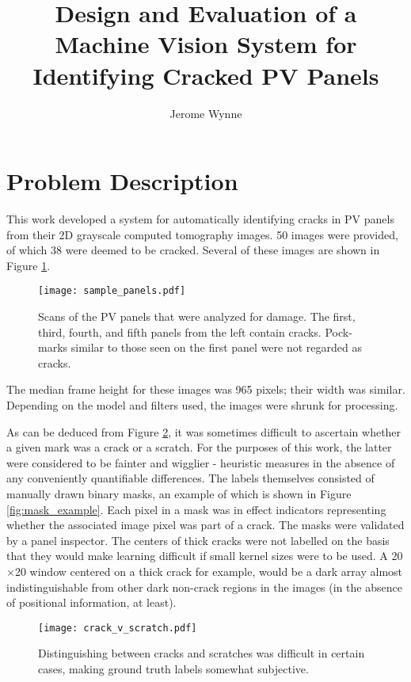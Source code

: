 \documentclass[11pt]{article} %
\title{Design and Evaluation of a Machine Vision System for Identifying Cracked PV Panels}
\author{Jerome Wynne}
\begin{document}
\maketitle

\section{Problem Description}

This work developed a system for automatically identifying cracks in PV panels from their 2D grayscale computed tomography images. 50 images were provided, of which 38 were deemed to be cracked. Several of these images are shown in Figure \ref{fig:sample_panels}.
\begin{figure}[h!]
\texttt{[image: sample\_panels.pdf]}
\caption{Scans of the PV panels that were analyzed for damage. The first, third, fourth, and fifth panels from the left contain cracks. Pock-marks similar to those seen on the first panel were not regarded as cracks.}
\label{fig:sample_panels}
\end{figure}

 The median frame height for these images was 965 pixels; their width was similar. Depending on the model and filters used, the images were shrunk for processing.


As can be deduced from Figure \ref{fig:crack_v_scratch}, it was sometimes difficult to ascertain whether a given mark was a crack or a scratch. For the purposes of this work, the latter were considered to be fainter and wigglier - heuristic measures in the absence of any conveniently quantifiable differences. The labels themselves consisted of manually drawn binary masks, an example of which is shown in Figure \ref{fig:mask_example}. Each pixel in a mask was in effect indicators representing whether the associated image pixel was part of a crack. {\color{red}The masks were validated by a panel inspector}. The centers of thick cracks were not labelled on the basis that they would make learning difficult if small kernel sizes were to be used. A 20$\times$20 window centered on a thick crack for example, would be a dark array almost indistinguishable from other dark non-crack regions in the images (in the absence of positional information, at least).

\begin{figure}[h!]
\centering
\texttt{[image: crack\_v\_scratch.pdf]}
\caption{Distinguishing between cracks and scratches was difficult in certain cases, making ground truth labels somewhat subjective.}
\label{fig:crack_v_scratch}
\end{figure}
\end{document}
